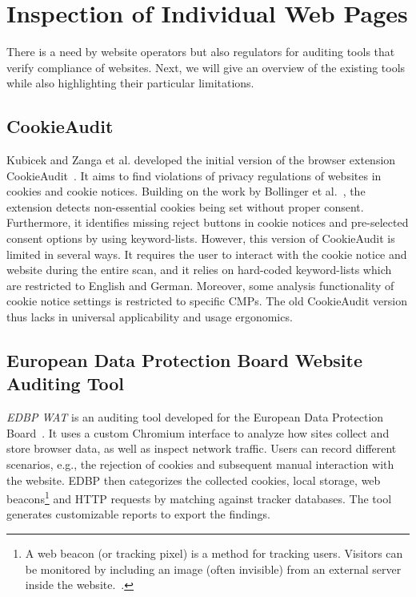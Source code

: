 \section{Inspection of Individual Web Pages}
There is a need by website operators but also regulators for auditing tools that verify compliance of websites.
Next, we will give an overview of the existing tools while also highlighting their particular limitations.

\subsection{CookieAudit}
Kubicek and Zanga et al. developed the initial version of the browser extension CookieAudit~\cite{kubicek2022cookieaudit}. 
It aims to find violations of privacy regulations of websites in cookies and cookie notices.
Building on the work by Bollinger et al.~\cite{bollinger2022automating}, the extension detects non-essential cookies being set without proper consent.
Furthermore, it identifies missing reject buttons in cookie notices and pre-selected consent options by using keyword-lists.
However, this version of CookieAudit is limited in several ways.
It requires the user to interact with the cookie notice and website during the entire scan, and it relies on hard-coded keyword-lists which are restricted to English and German.
Moreover, some analysis functionality of cookie notice settings is restricted to specific CMPs.
The old CookieAudit version thus lacks in universal applicability and usage ergonomics.

\subsection{European Data Protection Board Website Auditing Tool}
\emph{EDBP WAT} is an auditing tool developed for the European Data Protection Board~\cite{gorin2024edpb}.
It uses a custom Chromium interface to analyze how sites collect and store browser data, as well as inspect network traffic. 
Users can record different scenarios, e.g., the rejection of cookies and subsequent manual interaction with the website.
EDBP then categorizes the collected cookies, local storage, web beacons\footnote{
A web beacon (or tracking pixel) is a method for tracking users. 
Visitors can be monitored by including an image (often invisible) from an external server inside the website.~\cite{smith1999web}.
} and HTTP requests by matching against tracker databases.
The tool generates customizable reports to export the findings.

